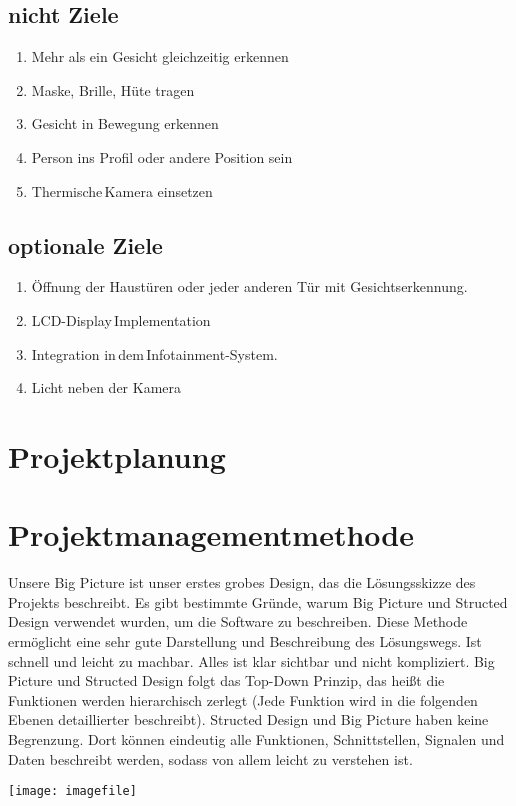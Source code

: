 \subsection{nicht Ziele}
\begin{enumerate}
	\item Mehr als ein Gesicht gleichzeitig erkennen   
	
	\item Maske, Brille, Hüte tragen   
	
	\item Gesicht in Bewegung erkennen   
	
	\item Person ins Profil oder andere Position sein  
	
	\item Thermische Kamera einsetzen
	
	
\end{enumerate}
\subsection{optionale Ziele}
\begin{enumerate}
	
	
	\item Öffnung der Haustüren oder jeder anderen Tür mit Gesichtserkennung.    
	
	\item LCD-Display Implementation 
	
	\item Integration in dem Infotainment-System.  
	
	\item Licht neben der Kamera 
\end{enumerate}
\section{Projektplanung}


\section{Projektmanagementmethode}


Unsere Big Picture ist unser erstes grobes Design, das die Lösungsskizze des Projekts beschreibt. Es gibt bestimmte Gründe, warum Big Picture und Structed Design verwendet wurden, um die Software zu beschreiben. Diese Methode ermöglicht eine sehr gute Darstellung und Beschreibung des Lösungswegs. Ist schnell und leicht zu machbar. Alles ist klar sichtbar und nicht kompliziert. Big Picture und Structed Design folgt das Top-Down Prinzip, das heißt die Funktionen werden hierarchisch zerlegt (Jede Funktion wird in die folgenden Ebenen detaillierter beschreibt). Structed Design und Big Picture haben keine Begrenzung. Dort können eindeutig alle Funktionen, Schnittstellen, Signalen und Daten beschreibt werden, sodass von allem leicht zu verstehen ist. 

\texttt{[image: imagefile]}